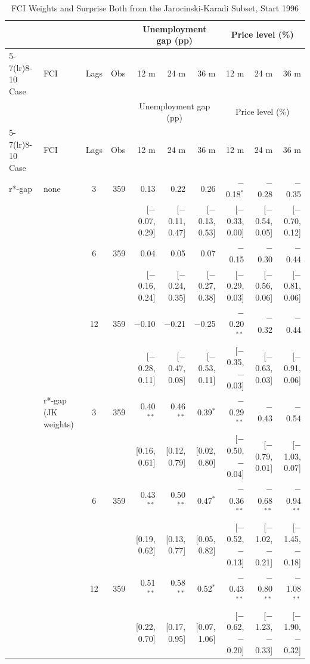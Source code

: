 \begingroup\scriptsize\setlength{\tabcolsep}{0.9pt}
\begin{longtable}{llcrrrrrrr}
\caption{FCI Weights and Surprise Both from the Jarocinski-Karadi Subset, Start 1996}\label{tab:appR5d}\\
\toprule
 & & & & \multicolumn{3}{c}{Unemployment gap (pp)} & \multicolumn{3}{c}{Price level (\%)}\\ \cmidrule(lr){5-7}\cmidrule(lr){8-10}
Case & FCI & Lags & Obs & 12 m & 24 m & 36 m & 12 m & 24 m & 36 m\\
\midrule\endfirsthead
\toprule
 & & & & \multicolumn{3}{c}{Unemployment gap (pp)} & \multicolumn{3}{c}{Price level (\%)}\\ \cmidrule(lr){5-7}\cmidrule(lr){8-10}
Case & FCI & Lags & Obs & 12 m & 24 m & 36 m & 12 m & 24 m & 36 m\\
\midrule\endhead
\bottomrule\endfoot
r*-gap & none & 3 & 359 & 0.13 & 0.22 & 0.26 & $-$0.18$^{*}$ & $-$0.28 & $-$0.35\\
 & & & & {\scriptsize [$-$0.07, 0.29]} & {\scriptsize [$-$0.11, 0.47]} & {\scriptsize [$-$0.13, 0.53]} & {\scriptsize [$-$0.33, 0.00]} & {\scriptsize [$-$0.54, 0.05]} & {\scriptsize [$-$0.70, 0.12]}\\
 &  & 6 & 359 & 0.04 & 0.05 & 0.07 & $-$0.15 & $-$0.30 & $-$0.44\\
 & & & & {\scriptsize [$-$0.16, 0.24]} & {\scriptsize [$-$0.24, 0.35]} & {\scriptsize [$-$0.27, 0.38]} & {\scriptsize [$-$0.29, 0.03]} & {\scriptsize [$-$0.56, 0.06]} & {\scriptsize [$-$0.81, 0.06]}\\
 &  & 12 & 359 & $-$0.10 & $-$0.21 & $-$0.25 & $-$0.20$^{**}$ & $-$0.32 & $-$0.44\\
 & & & & {\scriptsize [$-$0.28, 0.11]} & {\scriptsize [$-$0.47, 0.08]} & {\scriptsize [$-$0.53, 0.11]} & {\scriptsize [$-$0.35, $-$0.03]} & {\scriptsize [$-$0.63, 0.03]} & {\scriptsize [$-$0.91, 0.06]}\\
 & r*-gap (JK weights) & 3 & 359 & 0.40$^{**}$ & 0.46$^{**}$ & 0.39$^{*}$ & $-$0.29$^{**}$ & $-$0.43 & $-$0.54\\
 & & & & {\scriptsize [0.16, 0.61]} & {\scriptsize [0.12, 0.79]} & {\scriptsize [0.02, 0.80]} & {\scriptsize [$-$0.50, $-$0.04]} & {\scriptsize [$-$0.79, 0.01]} & {\scriptsize [$-$1.03, 0.07]}\\
 &  & 6 & 359 & 0.43$^{**}$ & 0.50$^{**}$ & 0.47$^{*}$ & $-$0.36$^{**}$ & $-$0.68$^{**}$ & $-$0.94$^{**}$\\
 & & & & {\scriptsize [0.19, 0.62]} & {\scriptsize [0.13, 0.77]} & {\scriptsize [0.05, 0.82]} & {\scriptsize [$-$0.52, $-$0.13]} & {\scriptsize [$-$1.02, $-$0.21]} & {\scriptsize [$-$1.45, $-$0.18]}\\
 &  & 12 & 359 & 0.51$^{**}$ & 0.58$^{**}$ & 0.52$^{*}$ & $-$0.43$^{**}$ & $-$0.80$^{**}$ & $-$1.08$^{**}$\\
 & & & & {\scriptsize [0.22, 0.70]} & {\scriptsize [0.17, 0.95]} & {\scriptsize [0.07, 1.06]} & {\scriptsize [$-$0.62, $-$0.20]} & {\scriptsize [$-$1.23, $-$0.33]} & {\scriptsize [$-$1.90, $-$0.32]}\\
\end{longtable}
